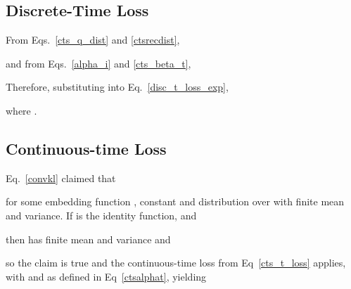 \documentclass[11pt,table]{article}
\newcommand{\0}[1]{\constvec{0}{#1}}
\newcommand{\1}[1]{\constvec{1}{#1}}
\begin{document}
\subsection{Discrete-Time Loss \texorpdfstring{}{}}\label{sec:cts_disc_t_loss}
From Eqs.~\ref{cts_q_dist} and \ref{ctsrecdist},

and from Eqs.~\ref{alpha_i} and \ref{cts_beta_t},

Therefore, substituting into Eq.~\ref{disc_t_loss_exp},

where .
\subsection{Continuous-time Loss \texorpdfstring{}{}}\label{sec:ctsctstloss}
Eq.~\ref{convkl} claimed that

for some embedding function , constant  and distribution  over  with finite mean and variance.
If  is the identity function,  and 

then  has finite mean and variance and

so the claim is true and the continuous-time loss from Eq~\ref{cts_t_loss} applies, with 
and  as defined in Eq~\ref{ctsalphat}, yielding
\end{document}
